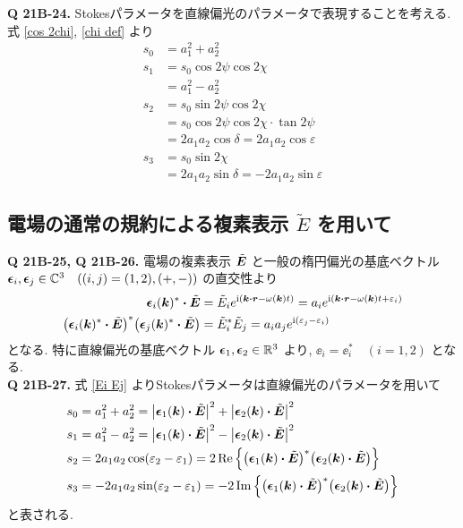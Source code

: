 \documentclass[uplatex,a4paper,dvipdfmx]{jsarticle}
\theoremstyle{definition}
\begin{document}
\textbf{Q 21B-24.}
Stokesパラメータを直線偏光のパラメータで表現することを考える. 式 \eqref{cos 2chi}, \eqref{chi def} より
\begin{align}
  s_0 & = a_1^2 + a_2^2                               \\
  s_1 & = s_0\cos2\psi\cos2\chi                       \\
      & = a_1^2 - a_2^2                               \\
  s_2 & = s_0\sin2\psi\cos2\chi                       \\
      & = s_0\cos2\psi\cos2\chi\cdot\tan2\psi         \\
      & = 2a_1a_2\cos\delta = 2a_1a_2\cos\varepsilon  \\
  s_3 & = s_0\sin2\chi                                \\
      & = 2a_1a_2\sin\delta = -2a_1a_2\sin\varepsilon
\end{align}

\subsection{電場の通常の規約による複素表示 $\tilde{E}$ を用いて}
\textbf{Q 21B-25, Q 21B-26.}
電場の複素表示 $\tilde{\vb*{E}}$ と一般の楕円偏光の基底ベクトル $\vb*{\epsilon}_i, \vb*{\epsilon}_j\in\mathbb{C}^3\quad ((i, j) = (1, 2), (+, -))$ の直交性より
\begin{align}
  \ee_i(\kk)^*\vdot\ET
   & = \Et_ie^{\ii(\kk\vdot\rr - \omega(\kk)t)} = a_ie^{\ii(\kk\vdot\rr - \omega(\kk)t + \varepsilon_i)} \\
  \qty(\ee_i(\kk)^*\vdot\ET)^*\qty(\ee_j(\kk)^*\vdot\ET)
   & = \Et_i^*\Et_j = a_ia_je^{\ii(\varepsilon_j - \varepsilon_i)} \label{Ei Ej}
\end{align}
となる. 特に直線偏光の基底ベクトル $\vb*{\epsilon}_1, \vb*{\epsilon}_2\in\mathbb{R}^3$ より, $\ee_i = \ee_i^*\quad(i=1,2)$ となる. \\

\textbf{Q 21B-27.}
式 \eqref{Ei Ej} よりStokesパラメータは直線偏光のパラメータを用いて
\begin{align}
  s_0 & = a_1^2 + a_2^2 = \qty|\ee_1(\kk)\vdot\ET|^2 + \qty|\ee_2(\kk)\vdot\ET|^2                                      \\
  s_1 & = a_1^2 - a_2^2 = \qty|\ee_1(\kk)\vdot\ET|^2 - \qty|\ee_2(\kk)\vdot\ET|^2                                      \\
  s_2 & = 2a_1a_2\cos(\varepsilon_2 - \varepsilon_1) = 2\Re\qty{\qty(\ee_1(\kk)\vdot\ET)^*\qty(\ee_2(\kk)\vdot\ET)}    \\
  s_3 & = - 2a_1a_2\sin(\varepsilon_2 - \varepsilon_1) = -2\Im\qty{\qty(\ee_1(\kk)\vdot\ET)^*\qty(\ee_2(\kk)\vdot\ET)}
\end{align}
と表される. \\
\end{document}
